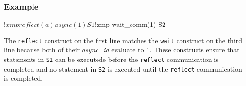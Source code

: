 \subsubsection*{Example}

\begin{Fexample}
!$xmp reflect (a) async(1)
      S1
!$xmp wait_comm(1)
      S2
\end{Fexample}

The {\tt reflect} construct on the first line matches
the {\tt wait} construct on the third line because both of their {\it
async\_id} evaluate to 1.
%
These constructs ensure that statements in {\tt S1} can be executede
before the {\tt reflect} communication is completed and no statement in
{\tt S2} is executed until the {\tt reflect} communication is
completed.
